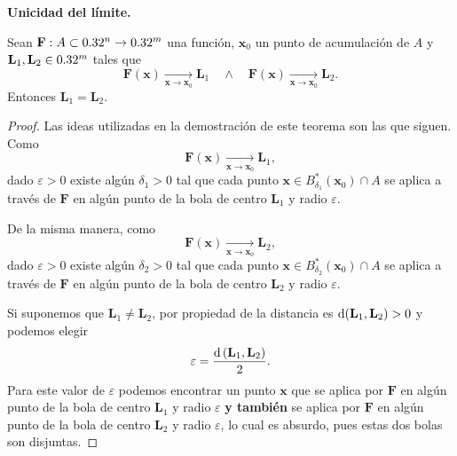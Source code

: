 \begin{theorem}\textbf{Unicidad del l\'imite.} \label{teo:unicidad_limite}
\mbox{}

Sean $\mathbf{F}:A \subset 0.32^n \to 0.32^m$ una funci\'on, $\mathbf{x}_0$ un punto de acumulaci\'on de $A$ y $\mathbf{L}_1, \mathbf{L}_2 \in 0.32^m$ tales que 
\[
 \mathbf{F}(\mathbf{x}) \xrightarrow[\mathbf{x} \to \mathbf{x}_0]{} \mathbf{L}_1 \quad \wedge \quad \mathbf{F}(\mathbf{x}) \xrightarrow[\mathbf{x} \to \mathbf{x}_0]{} \mathbf{L}_2.
\]
Entonces $\mathbf{L}_1 = \mathbf{L}_2$.
\begin{proof}
\mbox{}

Las ideas utilizadas en la demostraci\'on de este teorema son las que siguen.\\
Como 
\[
 \mathbf{F}(\mathbf{x}) \xrightarrow[\mathbf{x} \to \mathbf{x}_0]{} \mathbf{L}_1,
\]
dado $\varepsilon > 0$ existe alg\'un $\delta_1 > 0$ tal que cada punto $\mathbf{x} \in B_{\delta_1}^*(\mathbf{x}_0) \cap A$ se aplica a trav\'es de $\mathbf{F}$ en alg\'un punto de la bola de centro $\mathbf{L}_1$ y radio $\varepsilon$.

\def\Ro{2.0}
\def\Rb{1.0}
\def\Ra{3.0}
\def\sep{1.0*\Ro}



De la misma manera, como 
\[
 \mathbf{F}(\mathbf{\mathbf{x}}) \xrightarrow[\mathbf{\mathbf{x}} \to \mathbf{\mathbf{x}}_0]{} \mathbf{L}_2,
\]
dado $\varepsilon > 0$ existe alg\'un $\delta_2 > 0$ tal que cada punto $\mathbf{\mathbf{x}} \in B_{\delta_2}^*(\mathbf{\mathbf{x}}_0) \cap A$ se aplica a trav\'es de $\mathbf{F}$ en alg\'un punto de la bola de centro $\mathbf{L}_2$ y radio $\varepsilon$.



Si suponemos que $\mathbf{L}_1 \ne \mathbf{L}_2$, por propiedad de la distancia es $\operatorname{d}(\mathbf{L}_1,\mathbf{L}_2) > 0$ y podemos elegir 
\[
 \varepsilon = \frac{\operatorname{d}{(\mathbf{L}_1,\mathbf{L}_2)}}{2}.
\]
Para este valor de $\varepsilon$ podemos encontrar un punto $\mathbf{\mathbf{x}}$ que se aplica por $\mathbf{F}$ en alg\'un punto de la bola de centro $\mathbf{L}_1$ y radio $\varepsilon$ \textbf{y tambi\'en} se aplica por $\mathbf{F}$ en alg\'un punto de la bola de centro $\mathbf{L}_2$ y radio $\varepsilon$, lo cual es absurdo, pues estas dos bolas son disjuntas.




\end{proof}
\end{theorem}
